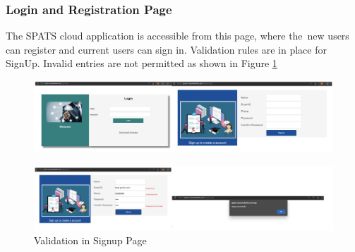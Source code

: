 \documentclass[10pt]{article}
\begin{document}
\subsubsection{Login and Registration Page}
The SPATS cloud application is accessible from this page, where the new users can register and current users can sign in. Validation rules are in place for SignUp. Invalid entries are not permitted as shown in Figure \ref{fig:6}
\begin{figure}[H]
    \begin{center}
        \includegraphics[width=0.9\linewidth,frame]{CA2-template/RIC5.png}
       
    \end{center}
\end{figure}
\begin{figure}[H]
    \begin{center}
        \includegraphics[width=0.9\linewidth,frame]{CA2-template/RIC6.png}
        \caption{Validation in Signup Page \label{fig:6}}
    \end{center}
\end{figure}
\end{document}
